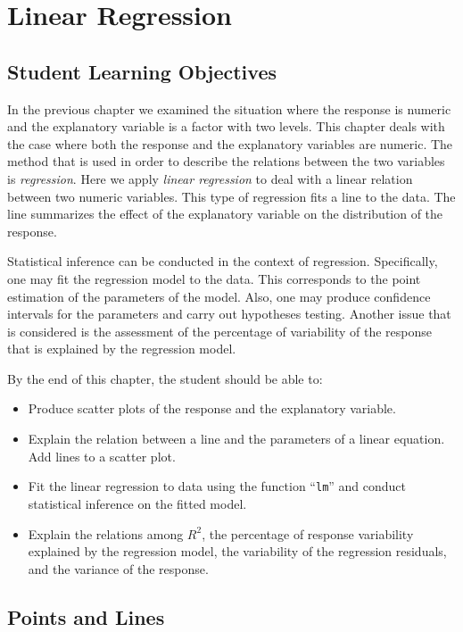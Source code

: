 \documentclass[]{krantz}
\theoremstyle{definition}
\theoremstyle{definition}
\theoremstyle{definition}
\theoremstyle{remark}
\begin{document}
\chapter{Linear Regression}\label{ChapRegression}

\section{Student Learning
Objectives}\label{student-learning-objectives-8}

In the previous chapter we examined the situation where the response is
numeric and the explanatory variable is a factor with two levels. This
chapter deals with the case where both the response and the explanatory
variables are numeric. The method that is used in order to describe the
relations between the two variables is \emph{regression}. Here we apply
\emph{linear regression} to deal with a linear relation between two
numeric variables. This type of regression fits a line to the data. The
line summarizes the effect of the explanatory variable on the
distribution of the response.

Statistical inference can be conducted in the context of regression.
Specifically, one may fit the regression model to the data. This
corresponds to the point estimation of the parameters of the model.
Also, one may produce confidence intervals for the parameters and carry
out hypotheses testing. Another issue that is considered is the
assessment of the percentage of variability of the response that is
explained by the regression model.

By the end of this chapter, the student should be able to:

\begin{itemize}
\item
  Produce scatter plots of the response and the explanatory variable.
\item
  Explain the relation between a line and the parameters of a linear
  equation. Add lines to a scatter plot.
\item
  Fit the linear regression to data using the function ``\texttt{lm}''
  and conduct statistical inference on the fitted model.
\item
  Explain the relations among \(R^2\), the percentage of response
  variability explained by the regression model, the variability of the
  regression residuals, and the variance of the response.
\end{itemize}

\section{Points and Lines}\label{points-and-lines}
\end{document}
